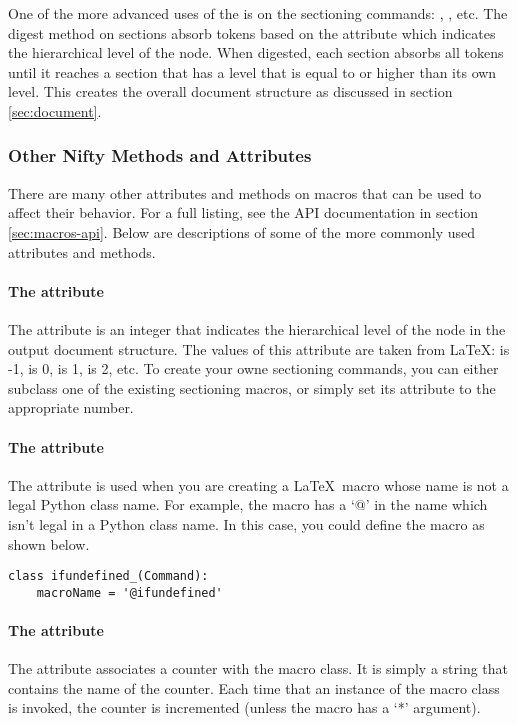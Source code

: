 One of the more advanced uses of the  is on the sectioning
commands: , , etc.  The digest method
on sections absorb tokens based on the  attribute which
indicates the hierarchical level of the node.  When digested, each section
absorbs all tokens until it reaches a section that has a level that is
equal to or higher than its own level.  This creates the overall 
document structure as discussed in section \ref{sec:document}.


\subsubsection{Other Nifty Methods and Attributes}

There are many other attributes and methods on macros that can be used
to affect their behavior.  For a full listing, see the API documentation
in section \ref{sec:macros-api}.  Below are descriptions of some of the
more commonly used attributes and methods.

\paragraph{The  attribute}
The  attribute is an integer that indicates the 
hierarchical level of the node in the output document structure.  
The values of this attribute are taken from \LaTeX: 
is -1,  is 0,  is 1, 
is 2, etc.  To create your owne sectioning commands, you can either
subclass one of the existing sectioning macros, or simply set its
 attribute to the appropriate number.

\paragraph{The  attribute}
The  attribute is used when you are creating a
\LaTeX\ macro whose name is not a legal Python class name.  
For example, the macro  has a `@' in the name
which isn't legal in a Python class name.  In this case, you could define
the macro as shown below.
\begin{verbatim}
class ifundefined_(Command):
    macroName = '@ifundefined'
\end{verbatim}

\paragraph{The  attribute}
The  attribute associates a counter with the macro
class.  It is simply a string that contains the name of the counter.
Each time that an instance of the macro class is invoked, the
counter is incremented (unless the macro has a `*' argument).

